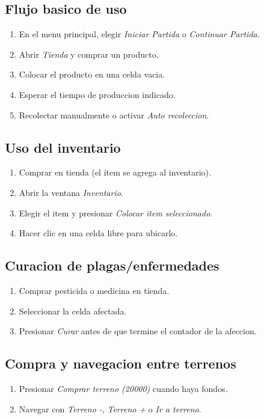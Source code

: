 \documentclass[12pt,a4paper]{article}
\begin{document}
\subsection{Flujo basico de uso}
\begin{enumerate}
    \item En el menu principal, elegir \textit{Iniciar Partida} o \textit{Continuar Partida}.
    \item Abrir \textit{Tienda} y comprar un producto.
    \item Colocar el producto en una celda vacia.
    \item Esperar el tiempo de produccion indicado.
    \item Recolectar manualmente o activar \textit{Auto recoleccion}.
\end{enumerate}

\subsection{Uso del inventario}
\begin{enumerate}
    \item Comprar en tienda (el item se agrega al inventario).
    \item Abrir la ventana \textit{Inventario}.
    \item Elegir el item y presionar \textit{Colocar item seleccionado}.
    \item Hacer clic en una celda libre para ubicarlo.
\end{enumerate}

\subsection{Curacion de plagas/enfermedades}
\begin{enumerate}
    \item Comprar pesticida o medicina en tienda.
    \item Seleccionar la celda afectada.
    \item Presionar \textit{Curar} antes de que termine el contador de la afeccion.
\end{enumerate}

\subsection{Compra y navegacion entre terrenos}
\begin{enumerate}
    \item Presionar \textit{Comprar terreno (20000)} cuando haya fondos.
    \item Navegar con \textit{Terreno -}, \textit{Terreno +} o \textit{Ir a terreno}.
\end{enumerate}
\end{document}
